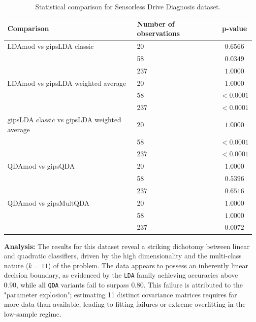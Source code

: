\documentclass[a4paper,11pt,twoside]{report}
\theoremstyle{definition}
\begin{document}
\begin{table}[H]
    \centering
    \begin{tabular}{llc}
        \toprule
        \textbf{Comparison} & \textbf{Number of observations} & \textbf{p-value} \\
        \midrule
        LDAmod vs gipsLDA classic & 20 & $0.6566$ \\
                                  & 58 & $0.0349$ \\
                                  & 237 & $1.0000$ \\
        \midrule
        LDAmod vs gipsLDA weighted average & 20 & $1.0000$ \\
                                           & 58 & $<0.0001$ \\
                                           & 237 & $<0.0001$ \\
        \midrule
        gipsLDA classic vs gipsLDA weighted average & 20 & $1.0000$ \\
                                                    & 58 & $<0.0001$ \\
                                                    & 237 & $<0.0001$ \\
        \midrule
        QDAmod vs gipsQDA & 20 & $1.0000$ \\
                          & 58 & $0.5396$ \\
                          & 237 & $0.6516$ \\
        \midrule
        QDAmod vs gipsMultQDA & 20 & $1.0000$ \\
                              & 58 & $1.0000$ \\
                              & 237 & $0.0072$ \\
        \bottomrule
    \end{tabular}
    \caption{Statistical comparison for Sensorless Drive Diagnosis dataset.}
\end{table}

\textbf{Analysis:}
The results for this dataset reveal a striking dichotomy between linear and quadratic classifiers, driven by the high dimensionality and the multi-class nature ($k=11$) of the problem. The data appears to possess an inherently linear decision boundary, as evidenced by the \texttt{LDA} family achieving accuracies above $0.90$, while all \texttt{QDA} variants fail to surpass $0.80$. This failure is attributed to the "parameter explosion"; estimating 11 distinct covariance matrices requires far more data than available, leading to fitting failures or extreme overfitting in the low-sample regime.
\end{document}
